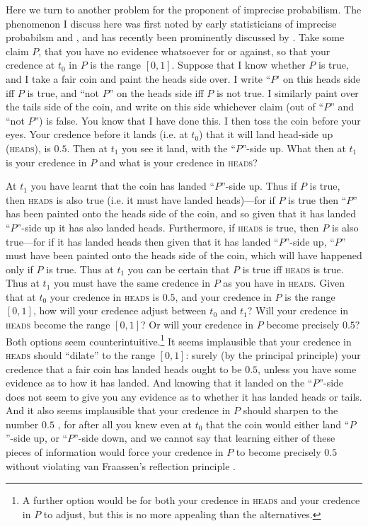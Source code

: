 Here we turn to another problem for the proponent of imprecise probabilism. The phenomenon I discuss here was first noted by early statisticians of imprecise probabilsm \citet{walley1991} and \citet{seidenfeldwasserman1993}, and has recently been prominently discussed by \citet{White2009}. Take some claim $P$, that you have no evidence whatsoever for or against, so that your credence at $t_0$ in $P$ is the range $[0,1]$. Suppose that I know whether $P$ is true, and I take a fair coin and paint the heads side over. I write ``$P$' on this heads side iff $P$ is true, and ``not $P$'' on the heads side iff $P$ is not true. I similarly paint over the tails side of the coin, and write on this side whichever claim (out of ``$P$'' and ``not $P$'') is false. You know that I have done this. I then toss the coin before your eyes. Your credence before it lands (i.e. at $t_0$) that it will land head-side up (\textsc{heads}), is $0.5$. Then at $t_1$ you see it land, with the ``$P$''-side up. What then at $t_1$ is your credence in $P$ and what is your credence in \textsc{heads}?

At $t_1$ you have learnt that the coin has landed ``$P$''-side up. Thus if $P$ is true, then \textsc{heads} is also true (i.e. it must have landed heads)---for if $P$ is true then ``$P$'' has been painted onto the heads side of the coin, and so given that it has landed ``$P$''-side up it has also landed heads. Furthermore, if \textsc{heads} is true, then $P$ is also true---for if it has landed heads then given that it has landed ``$P$''-side up, ``$P$'' must have been painted onto the heads side of the coin, which will have happened only if $P$ is true. Thus at $t_1$ you can be certain that $P$ is true iff \textsc{heads} is true. Thus  at $t_1$ you must have the same credence in $P$ as you have in \textsc{heads}. Given that at $t_0$ your credence in \textsc{heads} is $0.5$, and your credence in $P$ is the range $[0,1]$, how will your credence adjust between $t_0$ and $t_1$? Will your credence in \textsc{heads} become the range $[0,1]$? Or will your credence in $P$ become precisely $0.5$? Both options seem counterintuitive.\footnote{A further option would be for both your credence in \textsc{heads} and your credence in $P$ to adjust, but this is no more appealing than the alternatives.} It seems implausible that your credence in \textsc{heads} should ``dilate'' to the range $[0,1]$: surely (by the principal principle) your credence that a fair coin has landed heads ought to be $0.5$, unless you have some evidence as to how it has landed. And knowing that it landed on the ``$P$''-side does not seem to give you any evidence as to whether it has landed heads or tails. And it also seems implausible that your credence in $P$ should sharpen to the number $0.5$ \citep{White2009}, for after all you knew even at $t_0$ that the coin would either land ``$P$''-side up, or ``$P$''-side down, and we cannot say that learning either of these pieces of information would force your credence in $P$ to become precisely $0.5$ without violating van Fraassen's reflection principle \citep{fraassen1984}. 

